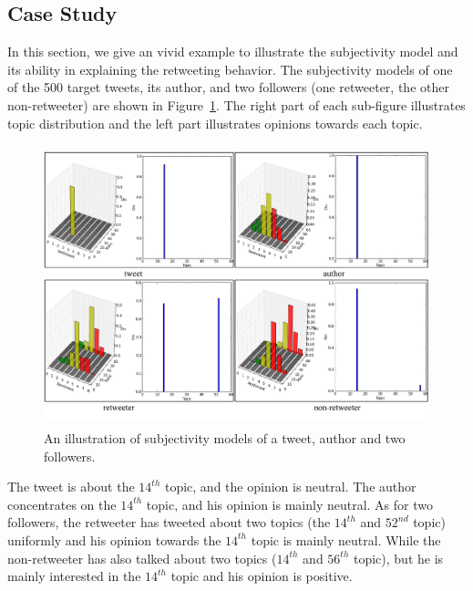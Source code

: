 \documentclass[letterpaper]{article}
\begin{document}
\subsection{Case Study}
\label{example}
In this section, we give an vivid example to illustrate the subjectivity model and its ability in explaining the retweeting behavior. 
The subjectivity models of one of the 500 target tweets, its author, and two followers (one retweeter, the other non-retweeter) are shown in Figure~\ref{fig5}. 
The right part of each sub-figure illustrates topic distribution and the left part illustrates opinions towards each topic. 
\begin{figure}[htb]
\centering
\includegraphics[width=5.5in,height=3.2in]{fig5.pdf}
\caption{An illustration of subjectivity models of a tweet, author and two followers.}
\label{fig5}
\end{figure}


The tweet is about the $ 14^{th} $ topic, and the opinion is neutral.
The author concentrates on the $ 14^{th} $ topic, and his opinion is mainly neutral.
As for two followers, the retweeter has tweeted about two topics (the $ 14^{th} $ and $ 52^{nd} $ topic) uniformly 
and his opinion towards the $ 14^{th} $ topic is mainly neutral.
While the non-retweeter has also talked about two topics ($ 14^{th} $ and $ 56^{th} $ topic), but he is mainly interested in the $ 14^{th} $ topic 
and his opinion is positive.
\end{document}
